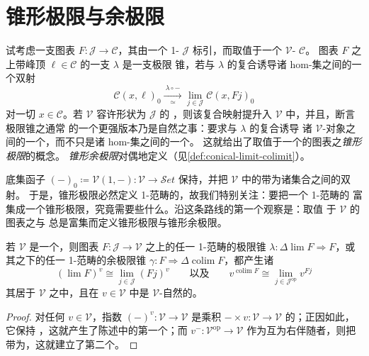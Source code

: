 
\providecommand{\sSet}{s\mathcal{S}et}
\providecommand{\colim}{\operatorname{colim}}

\section{锥形极限与余极限}\label{sec:conical-limits-and-colimits}

试考虑一支图表 $F\colon\mathcal{J}\to\mathcal{C}$，其由一个 1-\trCategory{}
$\mathcal{J}$ 标引，而取值于一个 $\mathcal{V}$-\trCategory{} $\mathcal{C}$。
图表 $F$ 之上带峰顶 $\ell\in\mathcal{C}$ 的一支\trCone{} $\lambda$ 是一支极限
锥，若与 $\lambda$ 的复合诱导诸 hom-集之间的一个双射
\[ \mathcal{C}(x,\ell)_{0}\xrightarrow[\ \simeq\ ]{\ \lambda\circ-\ }
   \lim_{j\in\mathcal{J}}\mathcal{C}(x,Fj)_{0} \]
对一切 $x\in\mathcal{C}$。若 $\mathcal{V}$ 容许形状为 $\mathcal{J}$ 的%
\trLimit，则该复合映射提升入 $\mathcal{V}$ 中，并且，断言极限锥之通常%
\trUniversalProperty{}的一个更强版本乃是自然之事：要求与 $\lambda$ 的复合诱导
诸 $\mathcal{V}$-对象之间的一个\trIsomorphism，而不只是诸 hom-集之间的一个。
这就给出了取值于一个\trEnrichedCategory{}的图表之\emph{锥形极限}的概念。%
\emph{锥形余极限}对偶地定义（见\cref{def:conical-limit-colimit}）。

底集函子 $(-)_{0}\coloneqq\mathcal{V}(1,-)\colon\mathcal{V}\to\mathcal{S}et$
保持\trLimit，并把 $\mathcal{V}$ 中的\trIsomorphism{}带为诸集合之间的双射。
于是，锥形极限必然定义 1-范畴的\trLimit，故我们特别关注：要把一个 1-范畴的%
\trLimit{}富集成一个锥形极限，究竟需要些什么。沿这条路线的第一个观察是：取值
于\trCartesianClosed{}\trCategory{} $\mathcal{V}$ 的图表之\trLimit{}与%
\trColimit{}总是富集而定义锥形极限与锥形余极限。

\begin{lemma}\label{lem:cc-conical}
若 $\mathcal{V}$ 是一个\trCartesianClosed{}\trCategory，则图表
$F\colon\mathcal{J}\to\mathcal{V}$ 之上的任一 1-范畴的极限锥
$\lambda\colon\Delta\lim F\Rightarrow F$，或其之下的任一 1-范畴的余极限锥
$\gamma\colon F\Rightarrow\Delta\colim F$，都产生诸\trIsomorphism
\[ (\lim F)^{v}\cong\lim_{j\in\mathcal{J}}(Fj)^{v}
   \qquad\text{以及}\qquad
   v^{\colim F}\cong\lim_{j\in\mathcal{J}^{\mathrm{op}}}v^{Fj} \]
其居于 $\mathcal{V}$ 之中，且在 $v\in\mathcal{V}$ 中是 $\mathcal{V}$-自然的。
\end{lemma}

\begin{proof}
对任何 $v\in\mathcal{V}$，指数\trFunctor{}
$(-)^{v}\colon\mathcal{V}\to\mathcal{V}$ 是乘积\trFunctor{}
$-\times v\colon\mathcal{V}\to\mathcal{V}$ 的\trRightAdjoint；正因如此，它保持%
\trLimit，这就产生了陈述中的第一个\trIsomorphism；而
$v^{-}\colon\mathcal{V}^{\mathrm{op}}\to\mathcal{V}$ 作为互为右伴随者，则把%
\trColimit{}带为\trLimit，这就建立了第二个。
\end{proof}

